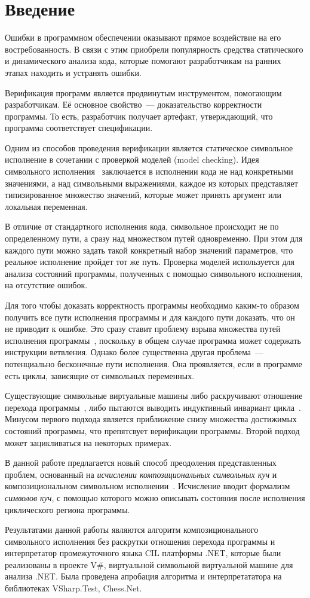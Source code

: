 \section*{Введение}
Ошибки в программном обеспечении оказывают прямое воздействие на его востребованность. 
В связи с этим приобрели популярность средства статического и динамического анализа кода, 
которые помогают разработчикам на ранних этапах находить и устранять ошибки.

Верификация программ является продвинутым инструментом, помогающим разработчикам. Её основное свойство~--- доказательство корректности программы. То есть, 
разработчик получает артефакт, утверждающий, что программа соответствует спецификации.

Одним из способов проведения верификации является статическое символьное исполнение в сочетании с проверкой моделей (model checking).
Идея символьного исполнения~\cite{king1976symbolic} заключается в исполнении кода не над конкретными значениями, а над символьными выражениями, каждое из которых представляет типизированное множество значений, которые может принять аргумент или локальная переменная.

В отличие от стандартного исполнения кода, символьное происходит не по определенному пути,
а сразу над множеством путей одновременно. При этом для каждого пути можно задать такой конкретный набор значений параметров, что реальное исполнение пройдет тот же путь. Проверка моделей используется для анализа состояний программы, полученных с помощью символьного исполнения, на отсутствие ошибок.

Для того чтобы доказать корректность программы необходимо каким-то образом получить все пути исполнения программы и для каждого пути доказать, что он не приводит к ошибке. Это сразу ставит проблему взрыва множества путей исполнения программы~\cite{baldoni2018survey}, 
поскольку в общем случае программа может содержать инструкции ветвления. 
Однако более существенна другая проблема~--- потенциально бесконечные пути исполнения. Она проявляется, если в программе есть циклы, зависящие от символьных переменных.

Существующие символьные виртуальные машины либо раскручивают отношение перехода программы~\cite{mcmillan2010lazy}, либо пытаются выводить индуктивный инвариант цикла~\cite{jaffar2012tracer}. Минусом первого подхода является приближение снизу множества достижимых состояний программы, что препятсвует верификации программы. 
Второй подход может зацикливаться на некоторых примерах.

В данной работе предлагается новый способ преодоления представленных проблем, основанный на \emph{исчислении композициональных символьных куч} и композициональном символьном исполнении~\cite{godefroid2007compositional}.
Исчисление вводит формализм \emph{символов куч}, с помощью которого можно описывать состояния после исполнения циклического региона программы.

Результатами данной работы являются алгоритм композиционального символьного исполнения без раскрутки отношения перехода программы и интерпретатор промежуточного языка CIL платформы .NET, которые были
реализованы в проекте V\#, виртуальной символьной виртуальной машине для анализа .NET. Была проведена апробация  алгоритма и интерпретататора на библиотеках VSharp.Test, Chess.Net.
